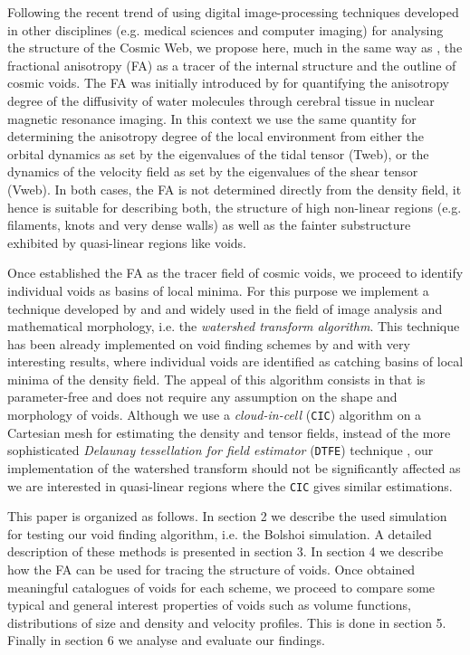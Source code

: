 \documentclass[a4,useAMS,usenatbib,usegraphicx]{latex/mn2e}
\begin{document}
Following the recent trend of using digital image-processing techniques 
developed in other disciplines (e.g. medical sciences and computer imaging) 
for analysing the structure of the Cosmic Web, we propose here, much in 
the same way as \citet{Libeskind13}, the fractional anisotropy (FA) as a 
tracer of the internal structure and the outline of cosmic voids. The FA 
was initially introduced by \citet{Basser95} for quantifying the 
anisotropy degree of the diffusivity of water molecules through cerebral
tissue in nuclear magnetic resonance imaging. In this context we use the 
same quantity for determining the anisotropy degree of the local 
environment from either the orbital dynamics as set by the eigenvalues of
the tidal tensor (Tweb), or the dynamics of the velocity field as set by 
the eigenvalues of the shear tensor (Vweb). In both cases, the FA is not
determined directly from the density field, it hence is suitable for 
describing both, the structure of high non-linear regions (e.g. filaments,
knots and very dense walls) as well as the fainter substructure exhibited 
by quasi-linear regions like voids.


Once established the FA as the tracer field of cosmic voids, we proceed to
identify individual voids as basins of local minima. For this purpose we
implement a technique developed by \citet{Beucher79} and \citet{Beucher93} 
and widely used in the field of image analysis and mathematical morphology, 
i.e. the \textit{watershed transform algorithm}. This technique has been 
already implemented on void finding schemes by \citet{Platen07} and 
\citet{Neyrinck08} with very interesting results, where individual voids 
are identified as catching basins of local minima of the density field. 
The appeal of this algorithm consists in that is parameter-free and does 
not require any assumption on the shape and morphology of voids. 
Although we use a \textit{cloud-in-cell} (\texttt{CIC}) algorithm on a 
Cartesian mesh for estimating the density and tensor fields, instead of 
the more sophisticated \textit{Delaunay tessellation for field estimator} 
(\texttt{DTFE}) technique \citep{Schaap00}, our implementation of the 
watershed transform should not be significantly affected as we are 
interested in quasi-linear regions where the \texttt{CIC} gives similar 
estimations.


This paper is organized as follows. In section 2 we describe the used
simulation for testing our void finding algorithm, i.e. the Bolshoi
simulation. A detailed description of these methods is presented in 
section 3. In section 4 we describe how the FA can be used for tracing the 
structure of voids. Once obtained meaningful catalogues of voids for each 
scheme, we proceed to compare some typical and general interest properties 
of voids such as volume functions, distributions of size and density and 
velocity profiles. This is done in section 5. Finally in section 6 we 
analyse and evaluate our findings.
\end{document}
